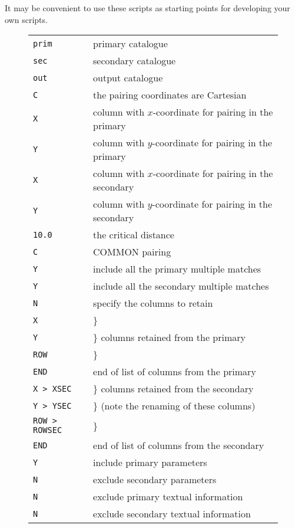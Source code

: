 \documentclass[twoside,11pt]{article}
\renewcommand{\_}{\texttt{\symbol{95}}}
\begin{document}
It may be convenient to use these scripts as starting points for
developing your own scripts.

\begin{figure}[htbp]

\begin{center}
\begin{tabular}{ll}
{\tt prim}        & primary catalogue \\
{\tt sec}         & secondary catalogue \\
{\tt out}         & output catalogue \\
{\tt C}           & the pairing coordinates are Cartesian \\
{\tt X}           & column with $x$-coordinate for pairing in the primary \\
{\tt Y}           & column with $y$-coordinate for pairing in the primary \\
{\tt X}           & column with $x$-coordinate for pairing in the secondary \\
{\tt Y}           & column with $y$-coordinate for pairing in the secondary \\
{\tt 10.0}        & the critical distance \\
{\tt C}           & COMMON pairing \\
{\tt Y}           & include all the primary multiple matches \\
{\tt Y}           & include all the secondary multiple matches \\
{\tt N}           & specify the columns to retain \\
{\tt X}           & \} \\
{\tt Y}           & \} columns retained from the primary \\
{\tt ROW}         & \}  \\
{\tt END}         & end of list of columns from the primary  \\
{\tt X > X\_SEC}  & \} columns retained from the secondary \\
{\tt Y > Y\_SEC}  & \} (note the renaming of these columns) \\
{\tt ROW > ROW\_SEC}    & \}   \\
{\tt END}         & end of list of columns from the secondary   \\
{\tt Y}           & include primary parameters \\
{\tt N}           & exclude secondary parameters \\
{\tt N}           & exclude primary textual information \\
{\tt N}           & exclude secondary textual information \\
\end{tabular}
\end{center}


\end{figure}
\end{document}
